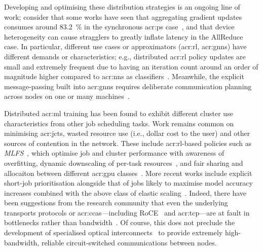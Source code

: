 Developing and optimising these distribution strategies is an ongoing line of work; consider that some works have seen that aggregating gradient updates consumes around \qty{83.2}{\percent} in the synchronous \gls{acr:ps} case~\parencite{DBLP:conf/isca/LiLYCSH19}, and that device heterogeneity can cause stragglers to greatly inflate latency in the AllReduce case.
In particular, different use cases or approximators (\gls{acr:rl}, \glspl{acr:gnn}) have different demands or characteristics; e.g., distributed \gls{acr:rl} policy updates are small and extremely frequent due to having an iteration count around an order of magnitude higher compared to \glspl{acr:nn} as classifiers~\parencite{DBLP:conf/isca/LiLYCSH19}.
Meanwhile, the explicit message-passing built into \glspl{acr:gnn} requires deliberate communication planning across nodes on one or many machines~\parencite{DBLP:conf/eurosys/Cai0WMCY21,DBLP:conf/eurosys/WangY0YCYYZ21}.

Distributed \gls{acr:ml} training has been found to exhibit different cluster use characteristics from other job scheduling tasks.
Work remains common on minimising \glspl{acr:jct}, wasted resource use (i.e., dollar cost to the user) and other sources of contention in the network.
These include \gls{acr:rl}-based policies such as \emph{MLFS}~\parencite{DBLP:conf/conext/0002LS20}, which optimise job and cluster performance with awareness of overfitting, dynamic downscaling of per-task resources~\parencite{DBLP:conf/eurosys/MisraLDBKGST21}, and fair sharing and allocaiton between different \gls{acr:gpu} classes~\parencite{DBLP:conf/eurosys/ChaudharyRSKV20}.
More recent works include explicit short-job prioritisation alongside that of jobs likely to maximise model accuracy increases combined with the above class of elastic scaling~\parencite{DBLP:conf/nsdi/HwangKKSP21}.
Indeed, there have been suggestions from the research community that even the underlying transports protocols or \glspl{acr:cca}---including RoCE~\parencite{rocev2} and \gls{acr:tcp}---are at fault in bottlenecks rather than bandwidth~\parencite{DBLP:conf/sigcomm/ZhangCLWAJ20}.
Of course, this does not preclude the development of specialised optical interconnects~\parencite{DBLP:conf/sigcomm/ShirkoohiGAZGBV21} to provide extremely high-bandwidth, reliable circuit-switched communications between nodes.

